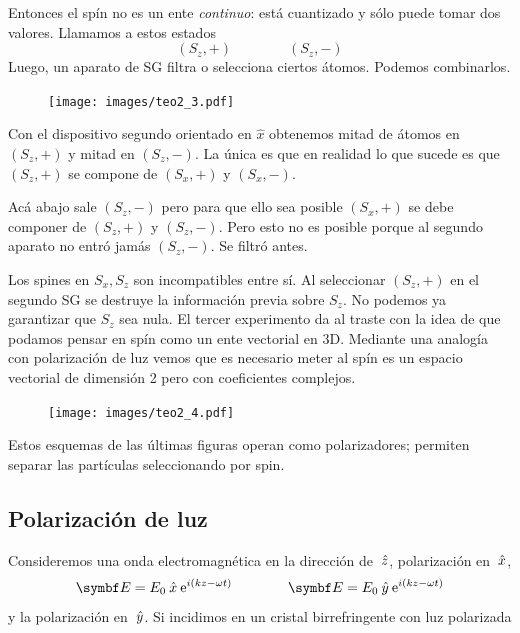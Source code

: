 \documentclass[10pt,oneside]{CBFT_book}
\begin{document}
Entonces el spín no es un ente {\it continuo}: está cuantizado y sólo puede tomar dos valores.
Llamamos a estos estados
\[
	(S_z,+) \qquad \qquad (S_z,-)
\]
Luego, un aparato de SG filtra o selecciona ciertos átomos. Podemos combinarlos.

\begin{figure}[htb]
	\begin{center}
	\texttt{[image: images/teo2\_3.pdf]}	 
	\end{center}
	\caption{}
\end{figure} 

Con el dispositivo segundo orientado en $\hat{x}$ obtenemos mitad de átomos en
$(S_z,+)$ y mitad en $(S_z,-)$. La única es que en realidad lo que sucede es que 
$(S_z,+)$ se compone de $(S_x,+)$ y $(S_x,-)$.

Acá abajo sale $(S_z,-)$ pero para que ello sea posible 
$(S_x,+)$ se debe componer de $(S_z,+)$ y $(S_z,-)$. Pero esto no es posible
porque al segundo aparato no entró jamás $(S_z,-)$. Se filtró antes.

Los spines en $S_x, S_z$ son incompatibles entre sí. Al seleccionar $(S_z,+)$ en el segundo
SG se destruye la información previa sobre $S_z$. No podemos ya garantizar que $S_z$
sea nula.
El tercer experimento da al traste con la idea de que podamos pensar en spín como un
ente vectorial en 3D. Mediante una analogía con polarización de luz vemos que es necesario
meter al spín es un espacio vectorial de dimensión 2 pero con coeficientes complejos.

\begin{figure}[htb]
	\begin{center}
	\texttt{[image: images/teo2\_4.pdf]}	 
	\end{center}
	\caption{}
\end{figure} 

Estos esquemas de las últimas figuras operan como polarizadores; permiten separar las
partículas seleccionando por spin.

\subsection{Polarización de luz}

Consideremos una onda electromagnética en la dirección de $\:\hat{z}$, polarización en $\:\hat{x}$,
\[
	\vb E = E_0 \xver \euler^{i( kz - \omega t)} \qquad \qquad 
	\vb E = E_0 \yver \euler^{i( kz - \omega t)}
\]
y la  polarización en $\:\hat{y}$.
Si incidimos en un cristal birrefringente con luz polarizada
\end{document}
